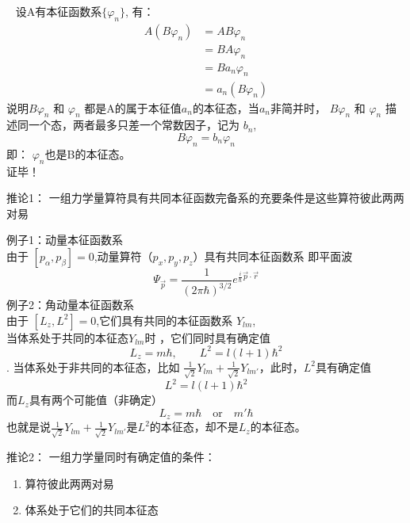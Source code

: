 \begin{frame} [allowframebreaks=]
    \证~ 设A有本征函数系$\{\varphi_n\}$, 有：
        \begin{equation*}
            \begin{split} 
            A(B\varphi_n)&= AB\varphi_n\\
            &=BA\varphi_n \\
            &=Ba_n\varphi_n \\
            &=a_n(B\varphi_n) 
            \end{split}  
        \end{equation*}  
        说明$B\varphi_n$ 和 $\varphi_n$ 都是A的属于本征值$a_n$的本征态，当$a_n$非简并时， 
        $B\varphi_n$ 和 $\varphi_n$ 描述同一个态，两者最多只差一个常数因子，记为 $b_n$,
        $$ B\varphi_n=b_n \varphi_n$$
        即： $\varphi_n$也是B的本征态。\\
        证毕！
\end{frame} 

\begin{frame} [allowframebreaks=]
    \begin{atcbox}{推论1：}
        一组力学量算符具有共同本征函数完备系的充要条件是这些算符彼此两两对易
    \end{atcbox}
    \alert{例子1：动量本征函数系} \\
    由于 $[p_\alpha,p_\beta]=0$,动量算符（$p_x, p_y, p_z$）具有共同本征函数系 即平面波\\
    $$ \Psi_{\vec p}= \frac{1}{(2\pi\hbar)^{3/2}} e^{\frac{i}{\hbar}\vec{p}\cdot\vec{r}}$$ 
    \alert{例子2：角动量本征函数系} \\
    由于 $[L_z,L^2]=0$,它们具有共同的本征函数系 {$Y_{lm}$},\\
    当体系处于共同的本征态$Y_{lm}$时 ，它们同时具有确定值
    $$L_z= m\hbar, \qquad L^2=l(l+1)\hbar ^2 $$.
    当体系处于非共同的本征态，比如 $\frac{1}{\sqrt{2}}Y_{lm} + \frac{1}{\sqrt{2}}Y_{lm'}$，此时，$L^2$具有确定值
    $$L^2=l(l+1)\hbar ^2 $$
    而$L_z$具有两个可能值（非确定）
    $$L_z= m\hbar\quad \text{or} \quad m'\hbar$$
    也就是说$\frac{1}{\sqrt{2}}Y_{lm} + \frac{1}{\sqrt{2}}Y_{lm'}$是$L^2$的本征态，却不是$L_z$的本征态。
\end{frame} 

\begin{frame}
    \begin{atcbox}{推论2：}
        一组力学量同时有确定值的条件：
    \begin{enumerate}
    \item 算符彼此两两对易
    \item 体系处于它们的共同本征态
    \end{enumerate}
    \end{atcbox}

\end{frame} 

